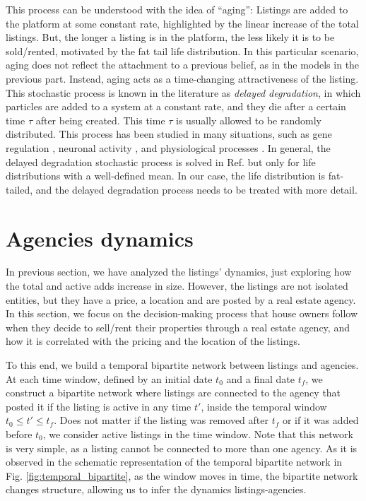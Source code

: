 This process can be understood with the idea of ``aging'': Listings are added to the platform at some constant rate, highlighted by the linear increase of the total listings. But, the longer a listing is in the platform, the less likely it is to be sold/rented, motivated by the fat tail life distribution. In this particular scenario, aging does not reflect the attachment to a previous belief, as in the models in the previous part. Instead, aging acts as a time-changing attractiveness of the listing. This stochastic process is known in the literature as \textit{delayed degradation}, in which particles are added to a system at a constant rate, and they die after a certain time $\tau$ after being created. This time $\tau$ is usually allowed to be randomly distributed. This process has been studied in many situations, such as gene regulation \cite{}, neuronal activity \cite{}, and physiological processes \cite{}. In general, the delayed degradation stochastic process is solved in Ref. \cite{LaFuerza2013} but only for life distributions with a well-defined mean. In our case, the life distribution is fat-tailed, and the delayed degradation process needs to be treated with more detail.

\section{Agencies dynamics}

In previous section, we have analyzed the listings' dynamics, just exploring how the total and active adds increase in size. However, the listings are not isolated entities, but they have a price, a location and are posted by a real estate agency. In this section, we focus on the decision-making process that house owners follow when they decide to sell/rent their properties through a real estate agency, and how it is correlated with the pricing and the location of the listings.

To this end, we build a temporal bipartite network between listings and agencies. At each time window, defined by an initial date $t_0$ and a final date $t_f$, we construct a bipartite network where listings are connected to the agency that posted it if the listing is active in any time $t'$, inside the temporal window $t_0 \leq t' \leq t_f$. Does not matter if the listing was removed after $t_f$ or if it was added before $t_0$, we consider active listings in the time window. Note that this network is very simple, as a listing cannot be connected to more than one agency. As it is observed in the schematic representation of the temporal bipartite network in Fig. \ref{fig:temporal_bipartite}, as the window moves in time, the bipartite network changes structure, allowing us to infer the dynamics listings-agencies.

